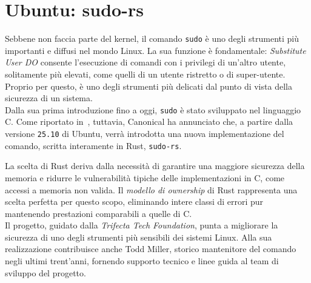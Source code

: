 \section{Ubuntu: sudo-rs}
Sebbene non faccia parte del kernel, il comando \texttt{sudo} è uno degli strumenti più importanti e diffusi nel mondo Linux.
La sua funzione è fondamentale: \textit{Substitute User DO} consente l'esecuzione di comandi con i privilegi di un'altro utente, solitamente più elevati,
come quelli di un utente ristretto o di super-utente.
Proprio per questo, è uno degli strumenti più delicati dal punto di vista della sicurezza di un sistema. \hfill
\vspace{5pt}\\
\noindent Dalla sua prima introduzione fino a oggi, \texttt{sudo} è stato sviluppato nel linguaggio C. Come riportato in~\cite{ubuntu-sudo-rs}, tuttavia, Canonical ha annunciato che,
a partire dalla versione \texttt{25.10} di Ubuntu, verrà introdotta una nuova implementazione del comando, scritta interamente in Rust, \texttt{sudo-rs}.

La scelta di Rust deriva dalla necessità di garantire una maggiore sicurezza della memoria e ridurre le vulnerabilità
tipiche delle implementazioni in C, come accessi a memoria non valida. Il \textit{modello di ownership} di Rust 
rappresenta una scelta perfetta per questo scopo, eliminando intere classi di errori pur mantenendo prestazioni comparabili a quelle di C. \hfill
\vspace{10pt}\\
\noindent Il progetto, guidato dalla \textit{Trifecta Tech Foundation}, punta a migliorare la sicurezza di uno degli strumenti più sensibili dei sistemi Linux.
Alla sua realizzazione contribuisce anche Todd Miller, storico mantenitore del comando negli ultimi trent'anni, fornendo supporto tecnico e linee guida 
al team di sviluppo del progetto.

